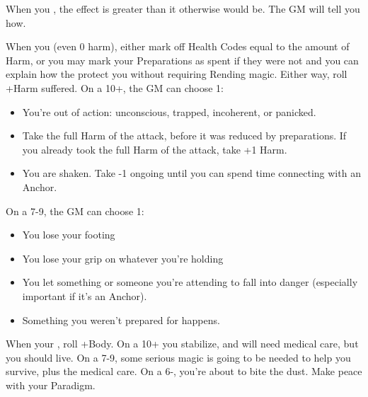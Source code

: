 



\begin{multicols}{3}
  
  \begin{move}
    When you , the
    effect is greater than it otherwise would be. The GM will tell you
    how.
  \end{move}  

  \SEPARATOR

  \begin{move}
    When you  (even 0 harm), either mark off
    Health Codes equal to the amount of Harm, or you may mark your
    Preparations as spent if they were not and you can explain how the
    protect you without requiring Rending magic. Either way, roll
    +Harm suffered. On a 10+, the GM can choose 1:
    \begin{itemize}
      \setlength\itemsep{0em}
    \item You're out of action: unconscious, trapped, incoherent, or
      panicked.
    \item Take the full Harm of the attack, before it was reduced by
      preparations. If you already took the full Harm of the attack, take
      +1 Harm.
    \item You are shaken. Take -1 ongoing until you can spend time
      connecting with an Anchor.
    \end{itemize}
    On a 7-9, the GM can choose 1:
    \begin{itemize}
      \setlength\itemsep{0em}
    \item You lose your footing
    \item You lose your grip on whatever you're holding
    \item You let something or someone you're attending to fall into
      danger (especially important if it's an Anchor).
    \item Something you weren't prepared for happens.
    \end{itemize}
    
  \end{move}

  \SEPARATOR

  \begin{move}
    When your , roll +Body. On a 10+ you
    stabilize, and will need medical care, but you should live. On a
    7-9, some serious magic is going to be needed to help you survive,
    plus the medical care. On a 6-, you're about to bite the
    dust. Make peace with your Paradigm.


\end{move}
\end{multicols}
